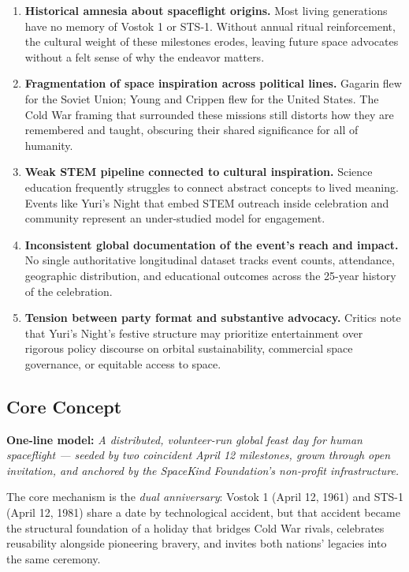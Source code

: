 \documentclass[11pt,letterpaper]{article}
\begin{document}
\begin{enumerate}[leftmargin=*, label=\textbf{P\arabic*.}]
  \item \textbf{Historical amnesia about spaceflight origins.} Most living generations have no memory of Vostok 1 or STS-1. Without annual ritual reinforcement, the cultural weight of these milestones erodes, leaving future space advocates without a felt sense of why the endeavor matters.

  \item \textbf{Fragmentation of space inspiration across political lines.} Gagarin flew for the Soviet Union; Young and Crippen flew for the United States. The Cold War framing that surrounded these missions still distorts how they are remembered and taught, obscuring their shared significance for all of humanity.

  \item \textbf{Weak STEM pipeline connected to cultural inspiration.} Science education frequently struggles to connect abstract concepts to lived meaning. Events like Yuri's Night that embed STEM outreach inside celebration and community represent an under-studied model for engagement.

  \item \textbf{Inconsistent global documentation of the event's reach and impact.} No single authoritative longitudinal dataset tracks event counts, attendance, geographic distribution, and educational outcomes across the 25-year history of the celebration.

  \item \textbf{Tension between party format and substantive advocacy.} Critics note that Yuri's Night's festive structure may prioritize entertainment over rigorous policy discourse on orbital sustainability, commercial space governance, or equitable access to space.
\end{enumerate}

\subsection{Core Concept}

\textbf{One-line model:} \emph{A distributed, volunteer-run global feast day for human spaceflight — seeded by two coincident April 12 milestones, grown through open invitation, and anchored by the SpaceKind Foundation's non-profit infrastructure.}

The core mechanism is the \emph{dual anniversary}: Vostok 1 (April 12, 1961) and STS-1 (April 12, 1981) share a date by technological accident, but that accident became the structural foundation of a holiday that bridges Cold War rivals, celebrates reusability alongside pioneering bravery, and invites both nations' legacies into the same ceremony.
\end{document}
